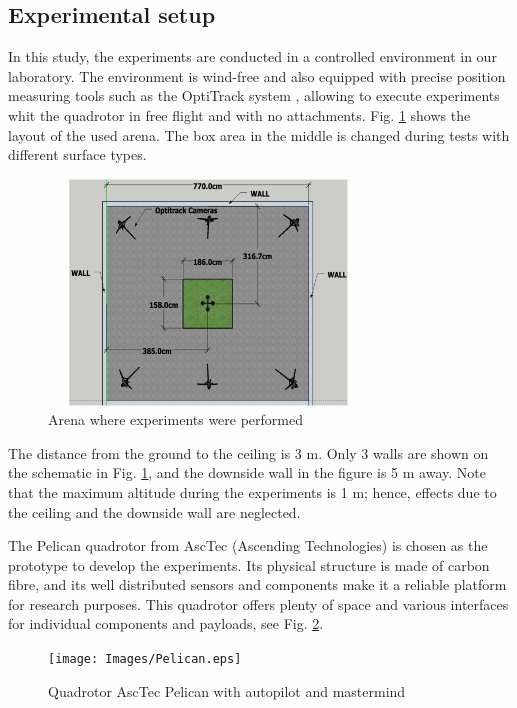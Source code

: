 \documentclass[twocolumn,10pt]{asme2ej}
\begin{document}
\subsection{Experimental setup}
In this study, the experiments are conducted in a controlled environment in our laboratory. The environment is wind-free and also equipped with precise position measuring tools such as the OptiTrack system \cite{Optitrack}, allowing to execute experiments whit the quadrotor in free flight and with no attachments. Fig. \ref{Arena} shows the layout of the used arena. The box area in the middle is changed during tests with different surface types.

\begin{figure}[t]
  \begin{center}
  \setlength{\unitlength}{0.012500in}%
  \includegraphics[width=8.5cm, height=6cm]{Images/arena.eps}
  \end{center}
  \caption{Arena where experiments were performed}
  \label{Arena}
\end{figure}

The distance from the ground to the ceiling is 3 m. Only 3 walls are shown on the schematic in Fig. \ref{Arena}, and the downside wall in the figure is 5 m away. Note that the maximum altitude during the experiments is 1 m; hence, effects due to the ceiling and the downside wall are neglected. 

The Pelican quadrotor from AscTec (Ascending Technologies)\cite{AscTec} is chosen as the prototype to develop the experiments. Its physical structure is made of carbon fibre, and its well distributed sensors and components make it a reliable platform for research purposes. This quadrotor offers plenty of space and various interfaces for individual components and payloads, see Fig. \ref{Pelican}.

\begin{figure}[t]
    \begin{center}
        \setlength{\unitlength}{0.012500in}%
        \texttt{[image: Images/Pelican.eps]}
    \end{center}
    \caption{Quadrotor AscTec Pelican with autopilot and mastermind}
    \label{Pelican}
\end{figure}
\end{document}
